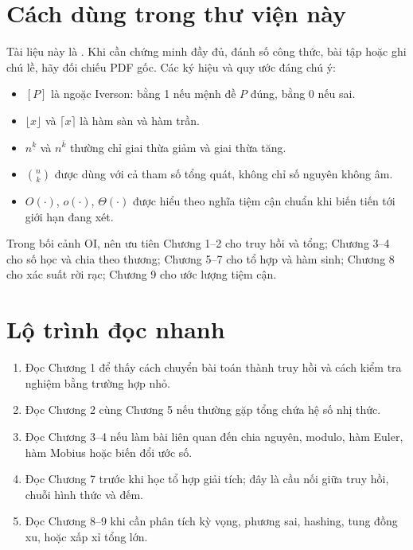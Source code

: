 \documentclass[11pt]{article}
\begin{document}
\section{Cách dùng trong thư viện này}

Tài liệu này là . Khi cần chứng minh đầy đủ,
đánh số công thức, bài tập hoặc ghi chú lề, hãy đối chiếu PDF gốc. Các ký hiệu
và quy ước đáng chú ý:
\begin{itemize}
  \item \([P]\) là ngoặc Iverson: bằng 1 nếu mệnh đề \(P\) đúng, bằng 0 nếu
        sai.
  \item \(\lfloor x\rfloor\) và \(\lceil x\rceil\) là hàm sàn và hàm trần.
  \item \(n^{\underline{k}}\) và \(n^{\overline{k}}\) thường chỉ giai thừa
        giảm và giai thừa tăng.
  \item \(\binom{n}{k}\) được dùng với cả tham số tổng quát, không chỉ số
        nguyên không âm.
  \item \(O(\cdot)\), \(o(\cdot)\), \(\Theta(\cdot)\) được hiểu theo nghĩa
        tiệm cận chuẩn khi biến tiến tới giới hạn đang xét.
\end{itemize}

Trong bối cảnh OI, nên ưu tiên Chương 1--2 cho truy hồi và tổng; Chương 3--4
cho số học và chia theo thương; Chương 5--7 cho tổ hợp và hàm sinh; Chương 8
cho xác suất rời rạc; Chương 9 cho ước lượng tiệm cận.

\section{Lộ trình đọc nhanh}

\begin{enumerate}
  \item Đọc Chương 1 để thấy cách chuyển bài toán thành truy hồi và cách kiểm
        tra nghiệm bằng trường hợp nhỏ.
  \item Đọc Chương 2 cùng Chương 5 nếu thường gặp tổng chứa hệ số nhị thức.
  \item Đọc Chương 3--4 nếu làm bài liên quan đến chia nguyên, modulo, hàm
        Euler, hàm Mobius hoặc biến đổi ước số.
  \item Đọc Chương 7 trước khi học tổ hợp giải tích; đây là cầu nối giữa truy
        hồi, chuỗi hình thức và đếm.
  \item Đọc Chương 8--9 khi cần phân tích kỳ vọng, phương sai, hashing, tung
        đồng xu, hoặc xấp xỉ tổng lớn.
\end{enumerate}
\end{document}
